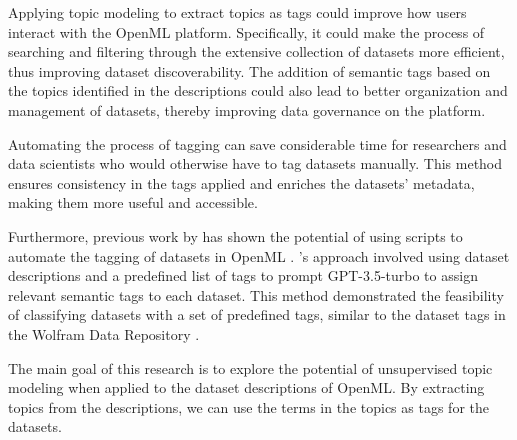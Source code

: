 Applying topic modeling to extract topics as tags could improve how users interact with the OpenML platform. Specifically, it could make the process of searching and filtering through the extensive collection of datasets more efficient, thus improving dataset discoverability. The addition of semantic tags based on the topics identified in the descriptions could also lead to better organization and management of datasets, thereby improving data governance on the platform.

Automating the process of tagging can save considerable time for researchers and data scientists who would otherwise have to tag datasets manually. This method ensures consistency in the tags applied and enriches the datasets' metadata, making them more useful and accessible.

Furthermore, previous work by \citeauthor{das_openmlscripts_nodate} has shown the potential of using scripts to automate the tagging of datasets in OpenML \cite{das_openmlscripts_nodate}. \citeauthor{das_openmlscripts_nodate}'s approach involved using dataset descriptions and a predefined list of tags to prompt GPT-3.5-turbo to assign relevant semantic tags to each dataset. This method demonstrated the feasibility of classifying datasets with a set of predefined tags, similar to the dataset tags in the Wolfram Data Repository \cite{noauthor_wolfram_nodate}.

The main goal of this research is to explore the potential of unsupervised topic modeling when applied to the dataset descriptions of OpenML. By extracting topics from the descriptions, we can use the terms in the topics as tags for the datasets.



